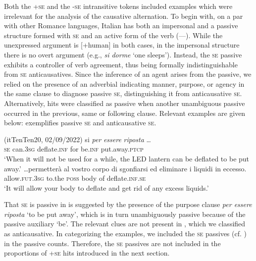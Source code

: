 \documentclass[output=paper,colorlinks,citecolor=brown
]{langscibook}
\begin{document}
Both the +\textsc{se} and the -\textsc{se} intransitive tokens included examples which were irrelevant for the analysis of the causative alternation. To begin with, on a par with other Romance languages, Italian has both an impersonal and a passive structure formed with \textsc{se} and an active form of the verb (—). While the unexpressed argument is [+human] in both cases, in the impersonal structure there is no overt argument (e.g., \textit{si dorme} ‘one sleeps’). Instead, the \textsc{se} passive exhibits a controller of verb agreement, thus being formally indistinguishable from \textsc{se} anticausatives. Since the inference of an agent arises from the passive, we relied on the presence of an adverbial indicating manner, purpose, or agency in the same clause to diagnose passive \textsc{se}, distinguishing it from anticausative \textsc{se}. Alternatively, hits were classified as passive when another unambiguous passive occurred in the previous, same or following clause. Relevant examples are given below:  exemplifies passive \textsc{se} and  anticausative \textsc{se}.

\ea (itTenTen20, 02/09/2022)\label{bentley_example_3}
    \ea \label{bentley_example_3a}
     si   \textit{per} \textit{essere} \textit{riposta} \ldots  \\
         {} \textsc{se} can.3\textsc{sg} deflate.\textsc{inf} for be.\textsc{inf} put.away.\textsc{ptcp} \\
    \glt ‘When it will not be used for a while, the LED lantern can be deflated to be put away.’
    \ex \label{bentley_example_3b}
    \gll  \ldots  permetterà al vostro corpo di sgonfiarsi {ed eliminare i liquidi in eccesso.} \\
    allow.\textsc{fut}.3\textsc{sg} to.the \textsc{poss} body of deflate.\textsc{inf}.\textsc{se} {} \\
    \glt ‘It will allow your body to deflate and get rid of any excess liquids.’
    \z
\z

That \textsc{se} is passive in  is suggested by the presence of the purpose clause \textit{per essere riposta} ‘to be put away’, which is in turn unambiguously passive because of the passive auxiliary ‘be’. The relevant clues are not present in , which we classified as anticausative. In categorizing the examples, we included the \textsc{se} passives (cf. ) in the passive counts. Therefore, the \textsc{se} passives are not included in the proportions of +\textsc{se} hits introduced in the next section. 
\end{document}
